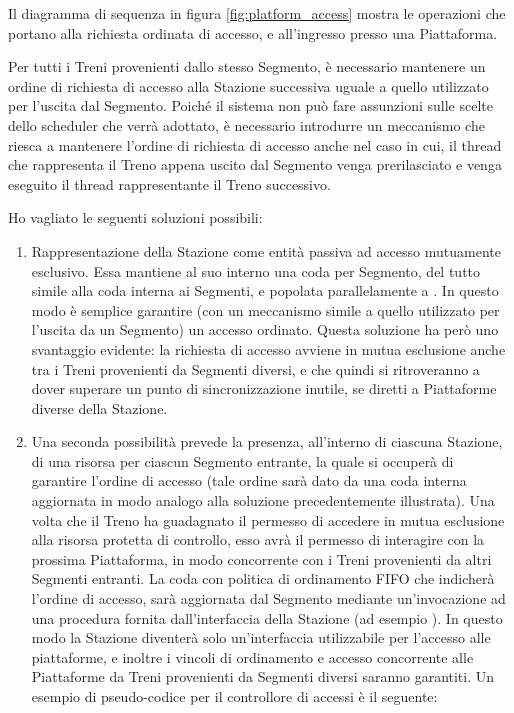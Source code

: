 		Il diagramma di sequenza in figura \ref{fig:platform_access} mostra le operazioni che portano alla richiesta ordinata di accesso, e all'ingresso presso una Piattaforma.
		\begin{description}
			\item{}
		
		Per tutti i Treni provenienti dallo stesso Segmento, è necessario mantenere un ordine di richiesta di accesso alla Stazione successiva uguale a quello utilizzato per l'uscita dal Segmento. Poiché il sistema non può fare assunzioni sulle scelte dello scheduler che verrà adottato, è necessario introdurre un meccanismo che riesca a mantenere l'ordine di richiesta di accesso anche nel caso in cui, il thread che rappresenta il Treno appena uscito dal Segmento venga prerilasciato e venga eseguito il thread rappresentante il Treno successivo.

		Ho vagliato le seguenti soluzioni possibili:
		\begin{enumerate}
			\item Rappresentazione della Stazione come entità passiva ad accesso mutuamente esclusivo. Essa mantiene al suo interno una coda per Segmento, del tutto simile alla coda  interna ai Segmenti, e popolata parallelamente a . In questo modo è semplice garantire (con un meccanismo simile a quello utilizzato per l'uscita da un Segmento) un accesso ordinato. Questa soluzione ha però uno svantaggio evidente: la richiesta di accesso avviene in mutua esclusione anche tra i Treni provenienti da Segmenti diversi, e che quindi si ritroveranno a dover superare un punto di sincronizzazione inutile, se diretti a Piattaforme diverse della Stazione.
			
			\item Una seconda possibilità prevede la presenza, all'interno di ciascuna Stazione, di una risorsa  per ciascun Segmento entrante, la quale si occuperà di garantire l'ordine di accesso (tale ordine sarà dato da una coda interna aggiornata in modo analogo alla soluzione precedentemente illustrata). Una volta che il Treno ha guadagnato il permesso di accedere in mutua esclusione alla risorsa protetta di controllo, esso avrà il permesso di interagire con la prossima Piattaforma, in modo concorrente con i Treni provenienti da altri Segmenti entranti. La coda con politica di ordinamento FIFO che indicherà l'ordine di accesso, sarà aggiornata dal Segmento mediante un'invocazione ad una procedura fornita dall'interfaccia della Stazione (ad esempio ).
			In questo modo la Stazione diventerà solo un'interfaccia utilizzabile per l'accesso alle piattaforme, e inoltre i vincoli di ordinamento e accesso concorrente alle Piattaforme da Treni provenienti da Segmenti diversi saranno garantiti.
			Un esempio di pseudo-codice per il controllore di accessi è il seguente:
			

\end{enumerate}
\end{description}

